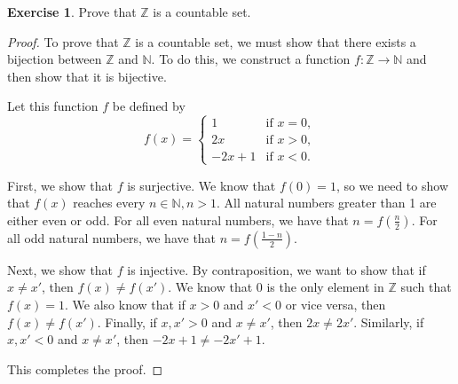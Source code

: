 \documentclass[11pt]{article}
\newcommand{\bbN}{\mathbb{N}}
\newcommand{\bbZ}{\mathbb{Z}}
\theoremstyle{definition}
\newtheorem{exercise}[theorem]{Exercise}
\numberwithin{equation}{subsection}
\begin{document}
\begin{exercise}
Prove that $\bbZ$ is a countable set.

\begin{proof}
To prove that $\bbZ$ is a countable set, we must show that there exists a bijection between $\bbZ$ and $\bbN$. To do this, we construct a function $f\colon \bbZ \rightarrow \bbN$ and then show that it is bijective.

Let this function $f$ be defined by
\[
f(x) = \begin{cases}
1 & \text{if } x = 0,\\
2x  & \text{if } x>0,\\
-2x+1  & \text{if } x<0.
\end{cases}
\]

First, we show that $f$ is surjective. We know that $f(0)=1$, so we need to show that $f(x)$ reaches every $n \in \bbN, n>1$. All natural numbers greater than 1 are either even or odd. For all even natural numbers, we have that $n = f(\frac{n}{2})$. For all odd natural numbers, we have that $n = f(\frac{1-n}{2})$.

Next, we show that $f$ is injective. By contraposition, we want to show that if $x \not= x'$, then $f(x) \not= f(x')$. We know that 0 is the only element in $\bbZ$ such that $f(x)=1$. We also know that if $x>0$ and $x'<0$ or vice versa, then $f(x) \not= f(x')$. Finally, if $x, x' >0$ and $x \not=x'$, then $2x\not=2x'$. Similarly, if $x, x' <0$ and $x \not=x'$, then $-2x+1\not=-2x'+1$.

This completes the proof.

\renewcommand\qedsymbol{QED}
\end{proof}

\end{exercise}
\end{document}
